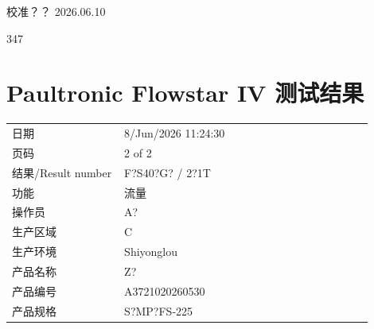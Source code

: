 \documentclass[UTF8,10pt,a4paper,fontset=fandol]{ctexart}
\newcommand{\fieldvalue}[1]{#1}
\newcommand{\handwritten}[1]{#1}
\begin{document}
\vspace{1em}

\handwritten{校准？？}\quad
\handwritten{2026.06.10}

\vspace{1em}

\handwritten{347}

\newpage

\section{Paultronic Flowstar IV 测试结果}

\begin{small}
\begin{tabular}{@{}p{0.28\linewidth}p{0.62\linewidth}@{}}
日期 &
\fieldvalue{8/Jun/2026 11:24:30} \\

页码 &
\fieldvalue{2 of 2} \\

结果/Result number &
\fieldvalue{F?S40?G? / 2?1T} \\

功能 &
\fieldvalue{流量} \\

操作员 &
\fieldvalue{A?} \\

生产区域 &
\fieldvalue{C} \\

生产环境 &
\fieldvalue{Shiyonglou} \\

产品名称 &
\fieldvalue{Z?} \\

产品编号 &
\fieldvalue{A3721020260530} \\

产品规格 &
\fieldvalue{S?MP?FS-225} \\


\end{tabular}
\end{small}
\end{document}
